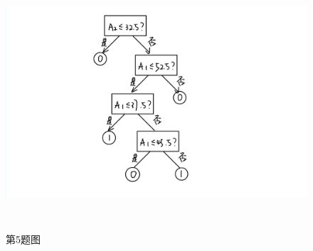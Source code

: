 \documentclass[answers]{exam}  %
\begin{document}
\begin{questions}
\begin{solution}
\begin{enumerate}
\begin{figure}[H]
                      \includegraphics[width=14.5cm,height=9.5cm]{IMG_0159.png}
                      \caption{第5题图}
                  \end{figure}
        \end{enumerate}
    \end{solution}

\end{questions}
\end{document}
